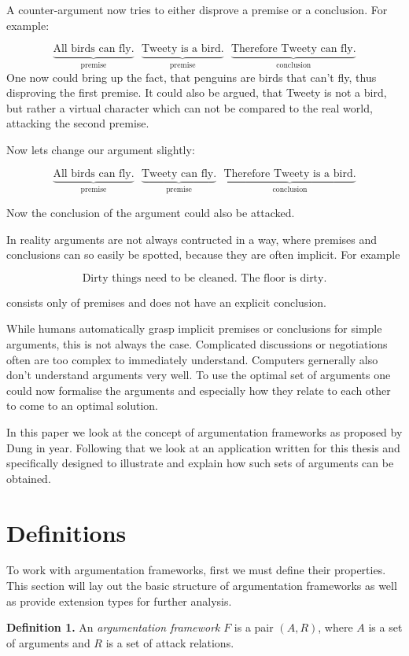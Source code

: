 \documentclass[draft,final]{vutinfth} %
\newcommand{\hl}{\par\vspace{6pt}} %
\newcommand{\cl}{\par\vspace{12pt}} %
\newcommand{\dl}{\par\vspace{24pt}} %
\begin{document}
A counter-argument now tries to either disprove a premise or a conclusion. For example:\hl
\[
	\underbrace{\text{All birds can fly.}}_\text{premise}\text{ }
	\underbrace{\text{Tweety is a bird.}}_\text{premise}\text{ }
	\underbrace{\text{Therefore Tweety can fly.}}_\text{conclusion}
\]
One now could bring up the fact, that penguins are birds that can't fly, thus disproving the first premise. It could also be argued, that Tweety is not a bird, but rather a virtual character which can not be compared to the real world, attacking the second premise.\hl

Now lets change our argument slightly:\hl
\[
	\underbrace{\text{All birds can fly.}}_\text{premise}\text{ }
	\underbrace{\text{Tweety can fly.}}_\text{premise}\text{ }
	\underbrace{\text{Therefore Tweety is a bird.}}_\text{conclusion}
\]\hl
Now the conclusion of the argument could also be attacked.\cl

In reality arguments are not always contructed in a way, where premises and conclusions can so easily be spotted, because they are often implicit. For example\hl
\[\text{Dirty things need to be cleaned. The floor is dirty.}\]\hl
consists only of premises and does not have an explicit conclusion.\hl
While humans automatically grasp implicit premises or conclusions for simple arguments, this is not always the case. Complicated discussions or negotiations often are too complex to immediately understand. Computers gernerally also don't understand arguments very well. To use the optimal set of arguments one could now formalise the arguments and especially how they relate to each other to come to an optimal solution.\hl %
In this paper we look at the concept of argumentation frameworks as proposed by Dung in {year}. %
Following that we look at an application written for this thesis and specifically designed to illustrate and explain how such sets of arguments can be obtained.

\chapter{Definitions}

To work with argumentation frameworks, first we must define their properties. This section will lay out the basic structure of argumentation frameworks as well as provide extension types for further analysis.\dl

\textbf{Definition 1.} An \emph{argumentation framework} $F$ is a pair $(A,R)$, where $A$ is a set of arguments and $R$ is a set of attack relations.\cl
\end{document}
